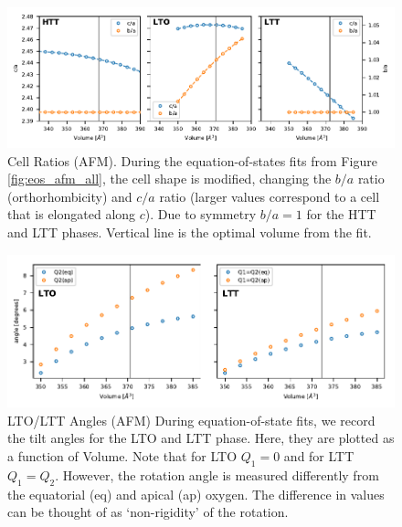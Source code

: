 \begin{figure}
    \centering
    \includegraphics[width=\textwidth]{fig/simulation/ratio_all.pdf}
    \caption[AFM: Cell ratios during EOS fits]{Cell Ratios (AFM). During the equation-of-states fits from Figure \ref{fig:eos_afm_all}, the cell shape is modified, changing the $b/a$ ratio (orthorhombicity) and $c/a$ ratio (larger values correspond to a cell that is elongated along $c$). Due to symmetry $b/a = 1$ for the HTT and LTT phases. Vertical line is the optimal volume from the fit.}
    \label{fig:eos_ratios_afm}
\end{figure}

\begin{figure}
    \centering
    \includegraphics[width=\textwidth]{fig/simulation/angles_lto_ltt.pdf}
    \caption[AFM: LTO/LTT angles during EOS fits]{LTO/LTT Angles (AFM) During equation-of-state fits, we record the tilt angles for the LTO and LTT phase. Here, they are plotted as a function of Volume. Note that for LTO $Q_1=0$ and for LTT $Q_1=Q_2$. However, the rotation angle is measured differently from the equatorial (eq) and apical (ap) oxygen. The difference in values can be thought of as `non-rigidity' of the rotation.}
    \label{fig:angles_afm}
\end{figure}

